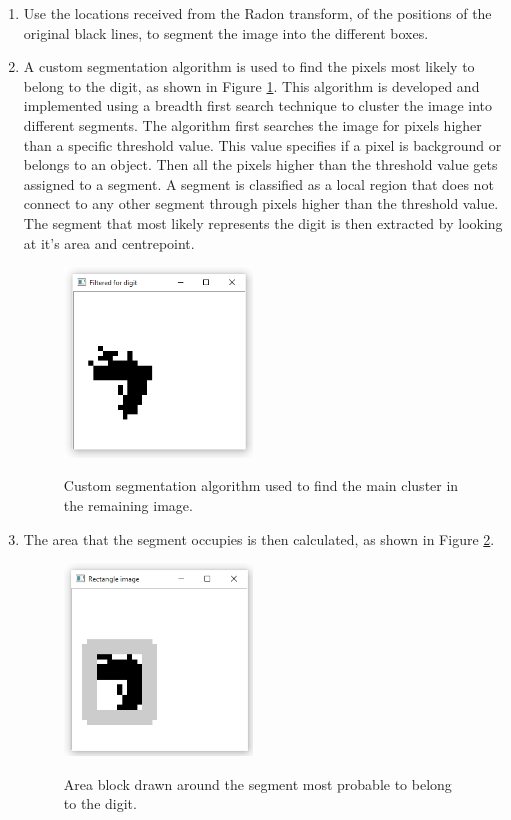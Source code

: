 \begin{enumerate}
\item Use the locations received from the Radon transform, of the positions of the original black lines, to segment the image into the different boxes.
\item A custom segmentation algorithm is used to find the pixels most likely to belong to the digit, as shown in Figure \ref{fig:c}. This algorithm is developed and implemented using a breadth first search technique to cluster the image into different segments. The algorithm first searches the image for pixels higher than a specific threshold value. This value specifies if a pixel is background or belongs to an object. Then all the pixels higher than the threshold value gets assigned to a segment. A segment is classified as a local region that does not connect to any other segment through pixels higher than the threshold value. The segment that most likely represents the digit is then extracted by looking at it's area and centrepoint.
\begin{figure}
  \centering
  \includegraphics[width=5cm]{Cluster}\\
  \caption{Custom segmentation algorithm used to find the main cluster in the remaining image.}
  \label{fig:c}
\end{figure}

\item The area that the segment occupies is then calculated, as shown in Figure \ref{fig:areaLoc}.

\begin{figure}
  \centering
  \includegraphics[width=5cm]{DetectArea}\\
  \caption{Area block drawn around the segment most probable to belong to the digit.}
  \label{fig:areaLoc}
\end{figure}


\end{enumerate}
